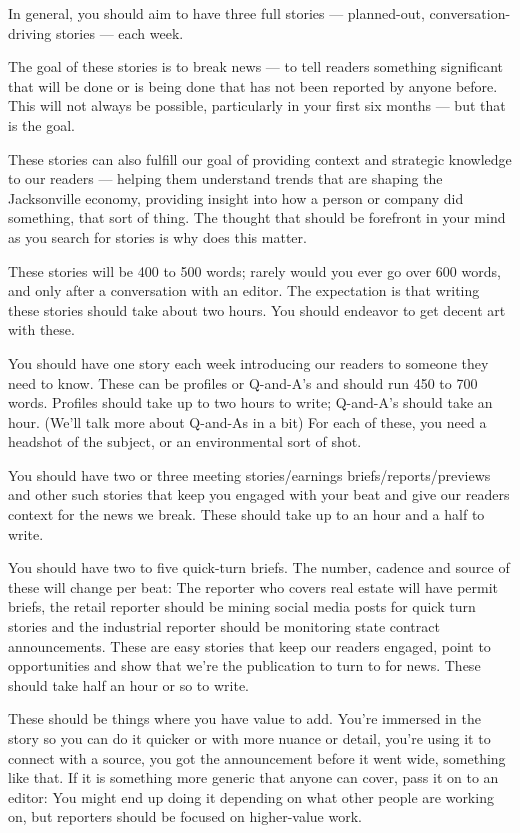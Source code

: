 \documentclass[
  12pt,
  american,
  letterpaperpaper,
  extrafontsizes,onecolumn,openright
  ]{memoir}
\begin{document}
In general, you should aim to have three full stories --- planned-out, conversation-driving stories --- each week.

The goal of these stories is to break news --- to tell readers something significant that will be done or is being done that has not been reported by anyone before. This will not always be possible, particularly in your first six months --- but that is the goal.

These stories can also fulfill our goal of providing context and strategic knowledge to our readers --- helping them understand trends that are shaping the Jacksonville economy, providing insight into how a person or company did something, that sort of thing. The thought that should be forefront in your mind as you search for stories is why does this matter.

These stories will be 400 to 500 words; rarely would you ever go over 600 words, and only after a conversation with an editor. The expectation is that writing these stories should take about two hours. You should endeavor to get decent art with these.

You should have one story each week introducing our readers to someone they need to know. These can be profiles or Q-and-A's and should run 450 to 700 words. Profiles should take up to two hours to write; Q-and-A's should take an hour. (We'll talk more about Q-and-As in a bit) For each of these, you need a headshot of the subject, or an environmental sort of shot.

You should have two or three meeting stories/earnings briefs/reports/previews and other such stories that keep you engaged with your beat and give our readers context for the news we break. These should take up to an hour and a half to write.

You should have two to five quick-turn briefs. The number, cadence and source of these will change per beat: The reporter who covers real estate will have permit briefs, the retail reporter should be mining social media posts for quick turn stories and the industrial reporter should be monitoring state contract announcements. These are easy stories that keep our readers engaged, point to opportunities and show that we're the publication to turn to for news. These should take half an hour or so to write.

These should be things where you have value to add. You're immersed in the story so you can do it quicker or with more nuance or detail, you're using it to connect with a source, you got the announcement before it went wide, something like that. If it is something more generic that anyone can cover, pass it on to an editor: You might end up doing it depending on what other people are working on, but reporters should be focused on higher-value work.
\end{document}
